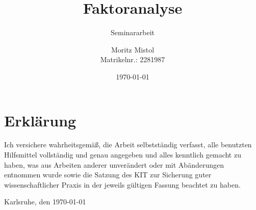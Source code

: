 \documentclass[11pt]{scrartcl}
\title{\vspace{6cm} Faktoranalyse}
\subtitle{Seminararbeit \vspace{2cm}}
\author{Moritz Mistol\\ Matrikelnr.: 2281987 \vspace{0.5cm}}
\date{{\today}\vspace{1cm}}
\begin{document}
	
	\pagestyle{fancy}
	\singlespacing
	
	
	\maketitle

	\thispagestyle{empty}
	\onehalfspacing
	
	
	
	
	
	
	
	
	
	\newpage
	\pagestyle{plain}
	{\hypersetup{hidelinks} \tableofcontents}
	
	
	
	
	
	
	
	
	
	\newpage
	\pagestyle{fancy}
	
	
	
	
	
	
	
	
	
	\pagestyle{plain}
	\listoffigures
	
	
	
	
	
	
	
	
	\newpage
	
	\printbibliography[heading=bibintoc,title={Literaturverzeichnis}]
	\pagestyle{plain}
	
	\newpage
	
	\section*{Erklärung}
	
	Ich versichere wahrheitsgemäß, die Arbeit selbstständig verfasst, alle benutzten
	Hilfsmittel vollständig und genau angegeben und alles kenntlich gemacht zu
	haben, was aus Arbeiten anderer unverändert oder mit Abänderungen entnommen
	wurde sowie die Satzung des KIT zur Sicherung guter wissenschaftlicher Praxis in
	der jeweils gültigen Fassung beachtet zu haben.
	
	\vspace{3cm}
	
	\hspace{0.5cm} Karlsruhe, den \today
	
	
	
\end{document}
